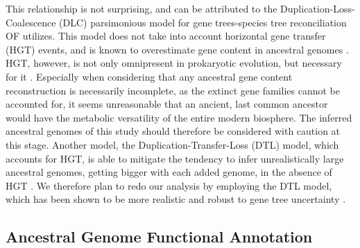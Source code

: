 This relationship is not surprising, and can be attributed to the Duplication-Loss-Coalescence (DLC) parsimonious model for gene trees-species tree reconciliation OF utilizes. This model does not take into account horizontal gene transfer (HGT) events, and is known to overestimate gene content in ancestral genomes \cite{doolittle2003}. HGT, however, is not only omnipresent in prokaryotic evolution, but necessary for it \cite{ochman2000}. Especially when considering that any ancestral gene content reconstruction is necessarily incomplete, as the extinct gene families cannot be accounted for, it seems unreasonable that an ancient, last common ancestor would have the metabolic versatility of the entire modern biosphere. The inferred ancestral genomes of this study should therefore be considered with caution at this stage. Another model, the Duplication-Transfer-Loss (DTL) model, which accounts for HGT, is able to mitigate the tendency to infer unrealistically large ancestral genomes, getting bigger with each added genome, in the absence of HGT \cite{doolittle2003}. We therefore plan to redo our analysis by employing the DTL model, which has been shown to be more realistic and robust to gene tree uncertainty \cite{szollosi2013, szollosi2015}.

\subsection*{Ancestral Genome Functional Annotation}

